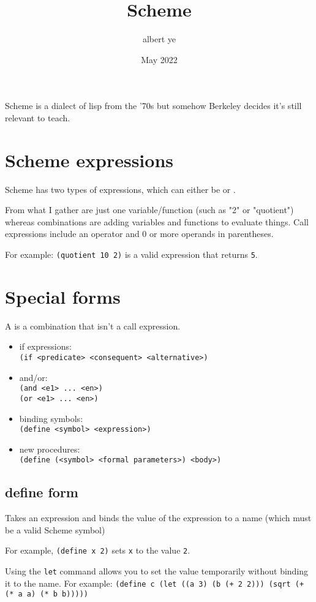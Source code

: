 \documentclass{scrartcl}
\title{Scheme}
\author{albert ye}
\date{May 2022}
\begin{document}
\maketitle
Scheme is a dialect of lisp from the '70s but somehow
Berkeley decides it's still relevant
to teach.
\section{Scheme expressions}
Scheme has two types of expressions, which can
either be  or .

From what I gather  are just
one variable/function (such as "2" or "quotient") whereas
combinations are adding variables and functions to evaluate
things. Call expressions include an operator and 0 or more
operands in parentheses.

For example: \texttt{(quotient 10 2)} is a valid expression
that returns \texttt{5}.
\section{Special forms}
A  is a combination that isn't a call 
expression.
\begin{itemize}
	\item if expressions: \\ \texttt{(if <predicate> <consequent> <alternative>)} 
	\item and/or: \\ \texttt{(and <e1> ... <en>)} \\ \texttt{(or <e1> ... <en>)}
	\item binding symbols: \\ \texttt{(define <symbol> <expression>)}
	\item new procedures: \\ \texttt{(define (<symbol> <formal parameters>) <body>)}
\end{itemize}
\subsection{define form}
Takes an expression and binds the value of the expression to a name (which must be 
a valid Scheme symbol)

For example, \texttt{(define x 2)} sets \texttt{x}
to the value \texttt{2}.

Using the \texttt{let} command allows you to set the value 
temporarily without binding it to the name. For example:
\texttt{(define c (let ((a 3) (b (+ 2 2))) (sqrt (+ (* a a) (* b b)))))}
\end{document}

